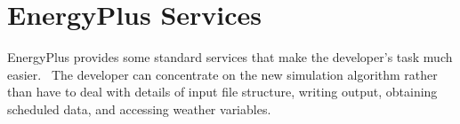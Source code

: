 \chapter{EnergyPlus Services}\label{energyplus-services}

EnergyPlus provides some standard services that make the developer's task much easier.~ The developer can concentrate on the new simulation algorithm rather than have to deal with details of input file structure, writing output, obtaining scheduled data, and accessing weather variables.
